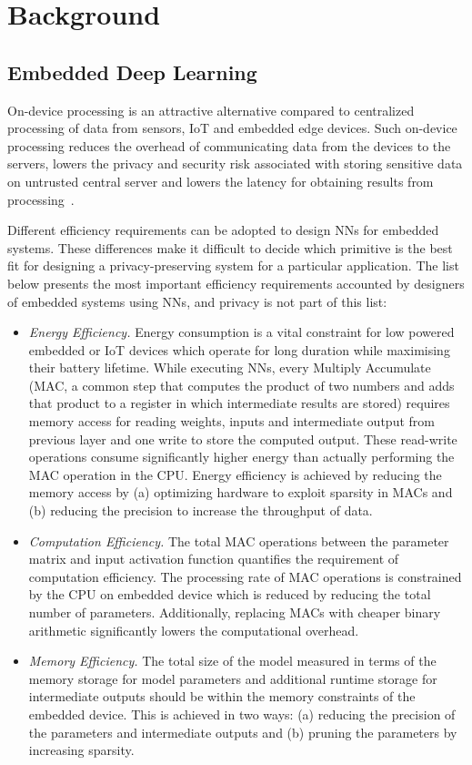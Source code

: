 \section{Background}
\label{background}

\subsection{Embedded Deep Learning}

On-device processing is an attractive alternative compared to centralized processing of data from sensors, IoT and embedded edge devices.
Such on-device processing reduces the overhead of communicating data from the devices to the servers, lowers the privacy and security risk associated with storing sensitive data on untrusted central server and lowers the latency for obtaining results from processing~\cite{8110880}.

Different efficiency requirements can be adopted to design NNs for embedded systems.
These differences make it difficult to decide which primitive is the best fit for designing a privacy-preserving system for a particular application.
The list below presents the most important efficiency requirements accounted by designers of embedded systems using NNs, and privacy is not part of this list:

\begin{itemize}[leftmargin=*]
\item {\em Energy Efficiency.} Energy consumption is a vital constraint for low powered embedded or IoT devices which operate for long duration while maximising their battery lifetime.
While executing NNs, every Multiply Accumulate (MAC, a common step that computes the product of two numbers and adds that product to a register in which intermediate results are stored) requires memory access for reading weights, inputs and intermediate output from previous layer and one write to store the computed output. These read-write operations consume significantly higher energy than actually performing the MAC operation in the CPU.
Energy efficiency is achieved by reducing the memory access by (a) optimizing hardware to exploit sparsity in MACs and (b) reducing the precision to increase the throughput of data.

\item {\em Computation Efficiency.} The total MAC operations between the parameter matrix and input activation function quantifies the requirement of computation efficiency.
The processing rate of MAC operations is constrained by the CPU on embedded device which is reduced by reducing the total number of parameters.
Additionally, replacing MACs with cheaper binary arithmetic significantly lowers the computational overhead.

\item {\em Memory Efficiency.} The total size of the model measured in terms of the memory storage for model parameters and additional runtime storage for intermediate outputs should be within the memory constraints of the embedded device.
This is achieved in two ways: (a) reducing the precision of the parameters and intermediate outputs and (b) pruning the parameters by increasing sparsity.
\end{itemize}


